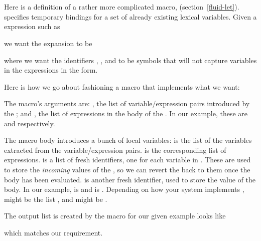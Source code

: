
\section{}
\label{fluid-let-macro}

Here is a definition of a rather more complicated
macro,  (section~\ref{fluid-let}).
 specifies temporary bindings for
a set of already existing lexical variables.  Given a
 expression such as


\n we want the expansion to be


\n where we want the identifiers , ,
  and  to be symbols that will not capture
variables in the expressions in the  form.

Here is how we go about fashioning a 
macro that implements what we want:


\n The macro’s arguments are:
, the list of
variable/expression pairs introduced by the ; and  
, the list of
expressions in the body of the .  In our
example, these are  and  respectively.

The macro body introduces a bunch of local variables:
 is the list of the variables extracted from the
variable/expression pairs. 
 is the corresponding list of
expressions.  is a list of fresh identifiers,
one for each variable in .  These are used to
store the {\em incoming} values of the , so we
can revert the  back to them once the
 body has been evaluated.
 is another
fresh identifier, used to store the value of the
 body.  In our example,  is 
and  is .  Depending on how your
system implements ,
 might be the
list , and  might be .

The output list is created by the macro for our given
example looks like


\n 
which matches our requirement.

